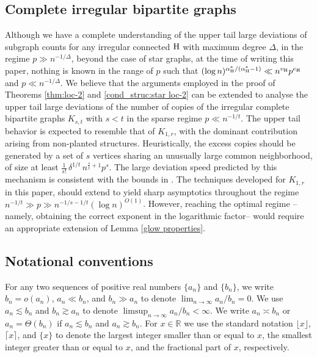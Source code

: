 \documentclass[a4paper,11pt,english,reqno]{amsart}
\numberwithin{equation}{section}
\newcommand{\N}{\mathbb{N}}
\newcommand{\R}{\mathbb{R}}
\newcommand{\tu}[1]{\textup{#1}}
\newcommand{\set}[1]{[\![#1]\!]}
\begin{document}
\subsection{Complete irregular bipartite graphs} 
Although we have a complete understanding of the upper tail large deviations of subgraph counts for  any irregular connected $\tu{H}$ with maximum degree $\Delta$, in the regime $p \gg n^{-1/\Delta}$, beyond the case of star graphs, at the time of writing this paper, nothing is known in the range of $p$ such that $(\log n)^{\alpha^*_{\tu H}/(\alpha_{\tu H}^*-1)} \ll n^{v_{\tu H}}p^{e_{\tu H}}$ and $p \ll n^{-1/\Delta}$. We believe that the arguments employed in the proof of Theorems \ref{thm:loc-2} and \ref{cond_struc:star loc-2} can be extended to analyse the upper tail large deviations of the number of copies of the
irregular complete bipartite graphs $K_{s,t}$ with $s<t$ in the sparse regime $p \ll n^{-1/t}$. %
The upper tail behavior is expected to resemble that of $K_{1,r}$, with the dominant contribution arising from non-planted structures. Heuristically, the excess copies should be generated by a set of  $s$ vertices sharing an unusually large common neighborhood, of size at least $\frac{1}{s!}\,\delta^{1/t}\, n^{\frac{s}{t}+1} p^s$.
The large deviation speed predicted by this mechanism is consistent with the bounds in \cite{JOR}.
The techniques developed for $K_{1,r}$ in this paper, should extend to yield sharp asymptotics throughout the regime $n^{-1/t} \gg p \gg n^{-1/s - 1/t} (\log n)^{O(1)}$.
However, reaching the optimal regime --namely, obtaining the correct exponent in the logarithmic factor-- would require an appropriate extension of Lemma \ref{glow properties}. %

	
	
	
	
	\subsection{Notational conventions}\label{sec:notation}
	For any two sequences of positive real numbers $\{a_{n}\}$ and $\{b_{n}\}$, we write $b_{n}=o(a_{n})$, $a_n\ll b_{n}$, and $b_{n}\gg a_{n}$ to denote $\lim_{n\rightarrow\infty } a_{n}/b_{n} = 0 $. We use $a_{n} \lesssim b_{n}$ and $b_n \gtrsim a_n$ to denote $\limsup_{n\rightarrow \infty} a_{n}/b_{n}<\infty$.  %
	We write $a_{n}\asymp b_{n}$ or $a_{n}=\Theta(b_{n})$ if $a_{n}\lesssim b_{n}$ and $a_n \gtrsim b_{n}$. For $x \in \R$ we use the standard notation $\lfloor x \rfloor$, $\lceil x \rceil$, and $\{x\}$ to denote the largest integer smaller than or equal to $x$, the smallest integer greater than or equal to $x$, and the fractional part of $x$, respectively. 
	
\end{document}
